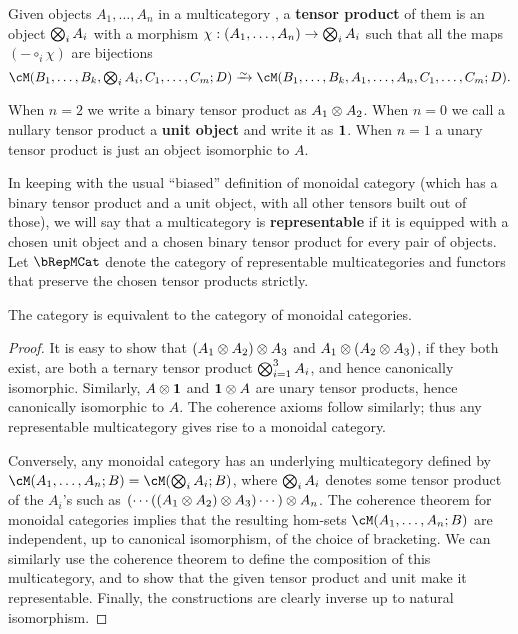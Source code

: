 \begin{defn}\label{defn:multicat-tensor}
  Given objects $A_1,\dots,A_n$ in a multicategory \cM, a \textbf{tensor product} of them is an object $\bigotimes_i A_i$ with a morphism $\chi:(A_1,\dots,A_n) \to \bigotimes_i A_i$ such that all the maps $(-\circ_i \chi)$ are bijections
  \[ \cM(B_1,\dots,B_k,\textstyle\bigtensor_i A_i,C_1,\dots,C_m;D) \toiso \cM(B_1,\dots,B_k,A_1,\dots,A_n,C_1,\dots,C_m;D). \]
\end{defn}

When $n=2$ we write a binary tensor product as $A_1\otimes A_2$.
When $n=0$ we call a nullary tensor product a \textbf{unit object} and write it as $\mathbf{1}$.
When $n=1$ a unary tensor product is just an object isomorphic to $A$.

In keeping with the usual ``biased'' definition of monoidal category (which has a binary tensor product and a unit object, with all other tensors built out of those), we will say that a multicategory is \textbf{representable} if it is equipped with a chosen unit object and a chosen binary tensor product for every pair of objects.
Let $\bRepMCat$ denote the category of representable multicategories and functors that preserve the chosen tensor products strictly.

\begin{thm}\label{thm:multicat-repr}
  The category \bRepMCat is equivalent to the category \bMonCat of monoidal categories.
\end{thm}
\begin{proof}
  It is easy to show that $(A_1\otimes A_2)\otimes A_3$ and $A_1 \otimes (A_2\otimes A_3)$, if they both exist, are both a ternary tensor product $\bigotimes_{i=1}^3 A_i$, and hence canonically isomorphic.
  Similarly, $A\otimes \mathbf{1}$ and $\mathbf{1}\otimes A$ are unary tensor products, hence canonically isomorphic to $A$.
  The coherence axioms follow similarly; thus any representable multicategory gives rise to a monoidal category.

  Conversely, any monoidal category \cM has an underlying multicategory defined by $\cM(A_1,\dots,A_n;B) = \cM(\bigtensor_i A_i;B)$, where $\bigotimes_i A_i$ denotes some tensor product of the $A_i$'s such as $(\cdots((A_1\otimes A_2)\otimes A_3)\cdots )\otimes A_n$.
  The coherence theorem for monoidal categories implies that the resulting hom-sets $\cM(A_1,\dots,A_n;B)$ are independent, up to canonical isomorphism, of the choice of bracketing.
  We can similarly use the coherence theorem to define the composition of this multicategory, and to show that the given tensor product and unit make it representable.
  Finally, the constructions are clearly inverse up to natural isomorphism.
\end{proof}

